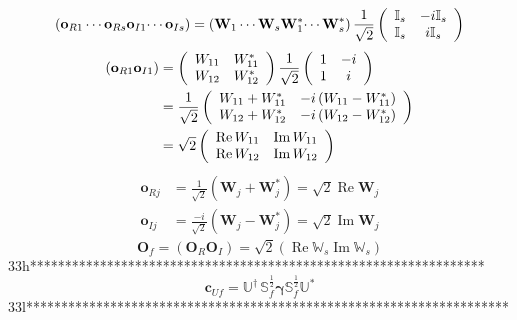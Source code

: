 \documentclass[aps,preprint]{revtex4}%
\begin{document}
\[
\left(  \mathbf{o}_{R1}\cdots\mathbf{o}_{Rs}\mathbf{o}_{I1}\mathbf{\cdots
o}_{Is}\right)  =\left(  \mathbf{W}_{1}\cdots\mathbf{W}_{s}\mathbf{W}%
_{1}^{\ast}\mathbf{\cdots W}_{s}^{\ast}\right)  \frac{1}{\sqrt{2}}\left(
\begin{array}
[c]{cc}%
\mathbb{I}_{s} & -i\mathbb{I}_{s}\\
\mathbb{I}_{s} & i\mathbb{I}_{s}%
\end{array}
\right)
\]%
\begin{align*}
\left(  \mathbf{o}_{R1}\mathbf{o}_{I1}\right)   &  =\left(
\begin{array}
[c]{cc}%
W_{11} & W_{11}^{\ast}\\
W_{12} & W_{12}^{\ast}%
\end{array}
\right)  \frac{1}{\sqrt{2}}\left(
\begin{array}
[c]{cc}%
1 & -i\\
1 & i
\end{array}
\right) \\
&  =\frac{1}{\sqrt{2}}\left(
\begin{array}
[c]{cc}%
W_{11}+W_{11}^{\ast} & -i\left(  W_{11}-W_{11}^{\ast}\right) \\
W_{12}+W_{12}^{\ast} & -i\left(  W_{12}-W_{12}^{\ast}\right)
\end{array}
\right) \\
&  =\sqrt{2}\left(
\begin{array}
[c]{cc}%
\operatorname{Re}W_{11} & \operatorname{Im}W_{11}\\
\operatorname{Re}W_{12} & \operatorname{Im}W_{12}%
\end{array}
\right)
\end{align*}%
\begin{align*}
\mathbf{o}_{Rj}  &  =\frac{1}{\sqrt{2}}\left(  \mathbf{W}_{j}+\mathbf{W}%
_{j}^{\ast}\right)  =\sqrt{2}\operatorname{Re}\mathbf{W}_{j}\\
\mathbf{o}_{Ij}  &  =\frac{-i}{\sqrt{2}}\left(  \mathbf{W}_{j}-\mathbf{W}%
_{j}^{\ast}\right)  =\sqrt{2}\operatorname{Im}\mathbf{W}_{j}%
\end{align*}%
\[
\mathbf{O}_{f}=\left(  \mathbf{O}_{R}\mathbf{O}_{I}\right)  =\sqrt{2}\left(
\operatorname{Re}\mathbb{W}_{s}\operatorname{Im}\mathbb{W}_{s}\right)
\]
33h*****************************************************************%
\[
\mathbf{c}_{Uf}=\mathbb{U}^{\dagger}\,\mathbb{S}_{f}^{\frac{1}{2}%
}\mathbf{\gamma}\mathbb{S}_{f}^{\frac{1}{2}}\mathbb{U}^{\ast}%
\]
33l*********************************************************************%
\end{document}
